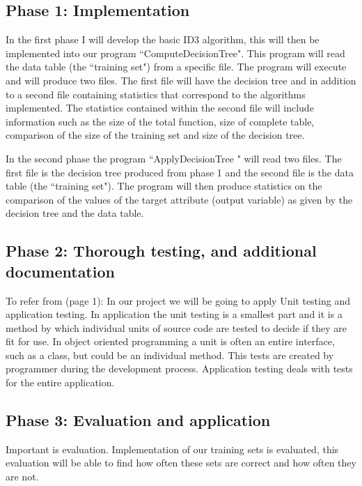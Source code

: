 \documentclass{report}
\begin{document}
\subsection{Phase 1: Implementation}
\label{sec:phase1}

In the first phase I will develop the basic ID3 algorithm, this will then be implemented into our program ``ComputeDecisionTree". This program will read the data table (the ``training set") from a specific file. The program will execute and will produce two files. The first file will have the decision tree and in addition to a second file containing statistics that correspond to the algorithms implemented. The statistics contained within the second file will 
include information such as the size of the total function, size of complete table, comparison of the size of the training set and size of the decision tree.

In the second phase the program ``ApplyDecisionTree " will read two files. The first file is the decision tree produced from phase 1 and the second file is the data table (the ``training set"). The program will then produce statistics on the comparison of the values of the target attribute (output variable) as given by the decision tree and the data table.


\subsection{Phase 2: Thorough testing, and additional documentation}
\label{sec:phase2}

To refer from \cite{Wikipedia_Unittesting}(page 1): In our project we will be going to apply Unit testing and application testing.
In application the unit testing is a smallest part and it is a method by which individual units of source code are tested to decide if they are fit for use. In object oriented programming a unit is often an entire interface, such as a class, but could be an individual method. This tests are created by programmer during the development process. Application testing deals with tests for the entire application. 

\subsection{Phase 3: Evaluation and application}
\label{sec:phase3}

Important is evaluation. Implementation of our training sets is evaluated, this evaluation will be able to find how often these sets are correct and how often they are not.
\end{document}
